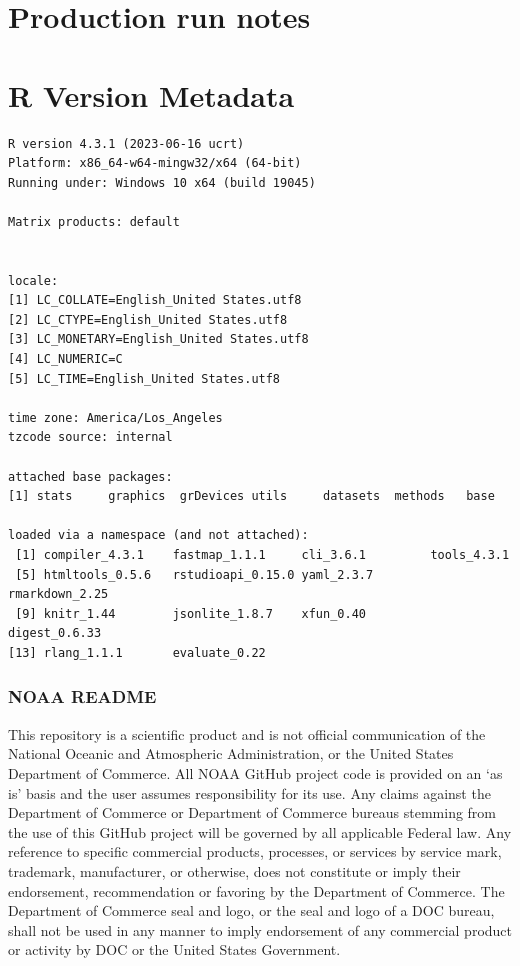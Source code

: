 \documentclass[
  letterpaper,
  oneside,
  open=any]{scrbook}
\begin{document}
\hypertarget{production-run-notes}{%
\chapter{Production run notes}\label{production-run-notes}}

\hypertarget{r-version-metadata}{%
\chapter{R Version Metadata}\label{r-version-metadata}}

\begin{verbatim}
R version 4.3.1 (2023-06-16 ucrt)
Platform: x86_64-w64-mingw32/x64 (64-bit)
Running under: Windows 10 x64 (build 19045)

Matrix products: default


locale:
[1] LC_COLLATE=English_United States.utf8 
[2] LC_CTYPE=English_United States.utf8   
[3] LC_MONETARY=English_United States.utf8
[4] LC_NUMERIC=C                          
[5] LC_TIME=English_United States.utf8    

time zone: America/Los_Angeles
tzcode source: internal

attached base packages:
[1] stats     graphics  grDevices utils     datasets  methods   base     

loaded via a namespace (and not attached):
 [1] compiler_4.3.1    fastmap_1.1.1     cli_3.6.1         tools_4.3.1      
 [5] htmltools_0.5.6   rstudioapi_0.15.0 yaml_2.3.7        rmarkdown_2.25   
 [9] knitr_1.44        jsonlite_1.8.7    xfun_0.40         digest_0.6.33    
[13] rlang_1.1.1       evaluate_0.22    
\end{verbatim}

\hypertarget{noaa-readme}{%
\subsection{NOAA README}\label{noaa-readme}}

This repository is a scientific product and is not official
communication of the National Oceanic and Atmospheric Administration, or
the United States Department of Commerce. All NOAA GitHub project code
is provided on an `as is' basis and the user assumes responsibility for
its use. Any claims against the Department of Commerce or Department of
Commerce bureaus stemming from the use of this GitHub project will be
governed by all applicable Federal law. Any reference to specific
commercial products, processes, or services by service mark, trademark,
manufacturer, or otherwise, does not constitute or imply their
endorsement, recommendation or favoring by the Department of Commerce.
The Department of Commerce seal and logo, or the seal and logo of a DOC
bureau, shall not be used in any manner to imply endorsement of any
commercial product or activity by DOC or the United States Government.
\end{document}
